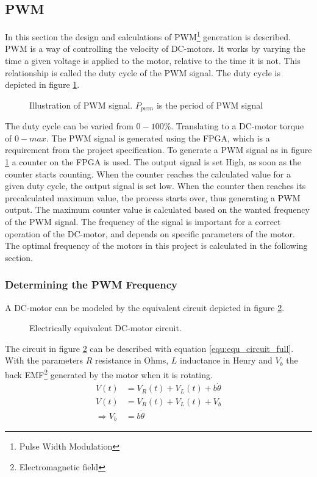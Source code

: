 \documentclass[../../../Main]{subfiles}
\begin{document}
\subsection{PWM}
In this section the design  and calculations of PWM\footnote{Pulse Width Modulation} generation is described. PWM is a way of controlling the velocity of DC-motors. It works by varying the time a given voltage is applied to the motor, relative to the time it is not. This relationship is called the duty cycle of the PWM signal. The duty cycle is depicted in figure \ref{fig:pwm}.

\begin{figure}[h]
  
  \caption{Illustration of PWM signal. $P_{pwm}$ is the period of PWM signal}
  \label{fig:pwm}
\end{figure}

The duty cycle can be varied from $0 - 100\%$. Translating to a DC-motor torque of $0 - max$.
The PWM signal is generated using the FPGA, which is a requirement from the project specification. To generate a PWM signal as in figure \ref{fig:pwm} a counter on the FPGA  is used.
The output signal is set High, as soon as the counter starts counting. When the counter reaches the calculated value for a given duty cycle, the output signal is set low. When the counter then reaches its precalculated maximum value, the process starts over, thus generating a PWM output. The maximum counter value is calculated based on the wanted frequency of the PWM signal. The frequency of the signal is important for a correct operation of the DC-motor, and depends on specific parameters of the motor. The optimal frequency of the motors in this project is calculated in the following section.

\subsubsection{Determining the PWM Frequency}

A DC-motor can be modeled by the equivalent circuit depicted in figure \ref{fig:electrical_equ}.

\begin{figure}[ht]
	\center
    \def\svgwidth{0.5\textwidth}
	
	\caption{Electrically equivalent DC-motor circuit.}
  \label{fig:electrical_equ}
\end{figure}
The circuit in figure \ref{fig:electrical_equ} can be described with equation \eqref{equ:equ_circuit_full}. With the parameters $R$ resistance in Ohms, $L$ inductance in Henry and $V_b$ the back EMF\footnote{Electromagnetic field} generated by the motor when it is rotating.
\begin{align}
	V(t) &= V_R(t) + V_L(t) + b\dot{\theta}\\
 \label{equ:equ_circuit_full}
	V(t) &= V_R(t) + V_L(t) + V_b\\
	\Rightarrow V_b &= b\dot{\theta}
\end{align}
\end{document}
